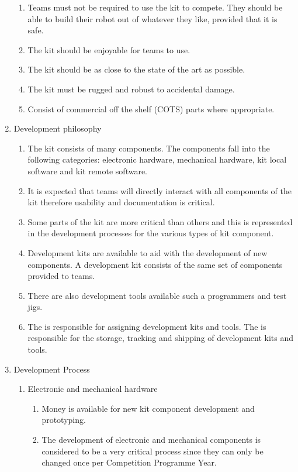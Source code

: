 \begin{enumerate}
\begin{enumerate}
    \item Teams must not be required to use the kit to compete.  They should be able to build their robot out of whatever they like, provided that it is safe.

    \item The kit should be enjoyable for teams to use.

    \item The kit should be as close to the state of the art as possible.

    \item The kit must be rugged and robust to accidental damage.
    \item{Consist of commercial off the shelf (COTS) parts where appropriate.}
  \end{enumerate}
\item Development philosophy
  \begin{enumerate}
    \item The kit consists of many components. The components fall into the following categories: electronic hardware, mechanical hardware, kit local software and kit remote software.
    \item It is expected that teams will directly interact with all components of the kit therefore usability and documentation is critical.
    \item Some parts of the kit are more critical than others and this is represented in the development processes for the various types of kit component.
    \item Development kits are available to aid with the development of new components. A development kit consists of the same set of components provided to teams.
    \item There are also development tools available such a programmers and test jigs.
    \item The  is responsible for assigning development kits and tools. The  is responsible for the storage, tracking and shipping of development kits and tools.
  \end{enumerate}
\item Development Process
  \begin{enumerate}
    \item Electronic and mechanical hardware
      \begin{enumerate}
        \item Money is available for new kit component development and prototyping.
        \item The development of electronic and mechanical components is considered to be a very critical process since they can only be changed once per Competition Programme Year.

\end{enumerate}
\end{enumerate}
\end{enumerate}
